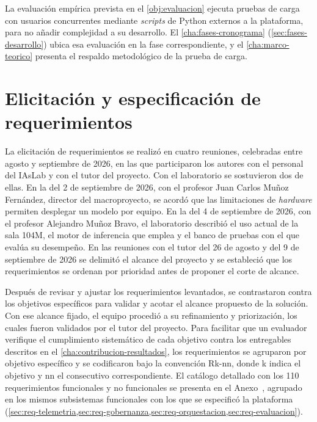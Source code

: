 La evaluación empírica prevista en el \cref{obj:evaluacion} ejecuta pruebas de carga con usuarios concurrentes mediante \emph{scripts} de Python externos a la plataforma, para no añadir complejidad a su desarrollo. El \cref{cha:fases-cronograma} (\cref{sec:fases-desarrollo}) ubica esa evaluación en la fase correspondiente, y el \cref{cha:marco-teorico} presenta el respaldo metodológico de la prueba de carga.

\section{Elicitación y especificación de requerimientos}
\label{sec:requerimientos-objetivo}

La elicitación de requerimientos se realizó en cuatro reuniones, celebradas entre agosto y septiembre de 2026, en las que participaron los autores con el personal del IAsLab y con el tutor del proyecto. Con el laboratorio se sostuvieron dos de ellas. En la del 2 de septiembre de 2026, con el profesor Juan Carlos Muñoz Fernández, director del macroproyecto, se acordó que las limitaciones de \emph{hardware} permiten desplegar un modelo por equipo. En la del 4 de septiembre de 2026, con el profesor Alejandro Muñoz Bravo, el laboratorio describió el uso actual de la sala 104M, el motor de inferencia que emplea y el banco de pruebas con el que evalúa su desempeño. En las reuniones con el tutor del 26 de agosto y del 9 de septiembre de 2026 se delimitó el alcance del proyecto y se estableció que los requerimientos se ordenan por prioridad antes de proponer el corte de alcance.

Después de revisar y ajustar los requerimientos levantados, se contrastaron contra los objetivos específicos para validar y acotar el alcance propuesto de la solución. Con ese alcance fijado, el equipo procedió a su refinamiento y priorización, los cuales fueron validados por el tutor del proyecto. Para facilitar que un evaluador verifique el cumplimiento sistemático de cada objetivo contra los entregables descritos en el \cref{cha:contribucion-resultados}, los requerimientos se agruparon por objetivo específico y se codificaron bajo la convención Rk-nn, donde k indica el objetivo y nn el consecutivo correspondiente. El catálogo detallado con los 110 requerimientos funcionales y no funcionales se presenta en el Anexo~, agrupado en los mismos subsistemas funcionales con los que se especificó la plataforma (\cref{sec:req-telemetria,sec:req-gobernanza,sec:req-orquestacion,sec:req-evaluacion}).

